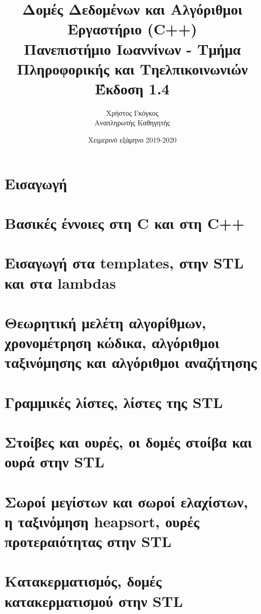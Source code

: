 \documentclass[11pt,a4paper,twoside,openany]{book}
\title{Δομές Δεδομένων και Αλγόριθμοι \\ Εργαστήριο (C++)\\ Πανεπιστήμιο Ιωαννίνων - Τμήμα Πληροφορικής και Τηελπικοινωνιών \\ Έκδοση 1.4}
\author{Χρήστος Γκόγκος  \\ Αναπληρωτής Καθηγητής }
\date{Χειμερινό εξάμηνο 2019-2020}
\begin{document}
\frontmatter
\maketitle
\tableofcontents
\mainmatter

\chapter*{Εισαγωγή}


\chapter{Βασικές έννοιες στη C και στη C++}


\chapter{Εισαγωγή στα templates, στην STL και στα lambdas}


\chapter{Θεωρητική μελέτη αλγορίθμων, χρονομέτρηση κώδικα, αλγόριθμοι ταξινόμησης και αλγόριθμοι αναζήτησης}


\chapter{Γραμμικές λίστες, λίστες της STL}


\chapter{Στοίβες και ουρές, οι δομές στοίβα και ουρά στην STL}


\chapter{Σωροί μεγίστων και σωροί ελαχίστων, η ταξινόμηση heapsort, ουρές προτεραιότητας στην STL}


\chapter{Κατακερματισμός, δομές κατακερματισμού στην STL}

\end{document}
